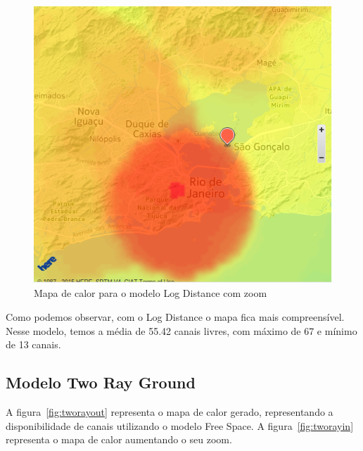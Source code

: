 \begin{figure}[htb]
\centering
\includegraphics[width=1.0\textwidth]{figs/logdistancein}
\caption[Mapa de calor para o modelo Log Distance com zoom]
{Mapa de calor para o modelo Log Distance com zoom}
\label{fig:logdistancein}
\end{figure} 

\FloatBarrier

Como podemos observar, com o Log Distance o mapa fica mais compreensível. Nesse modelo, temos a média de 55.42 canais livres, com máximo de 67 e mínimo de 13 canais.

\subsection{Modelo Two Ray Ground}

A figura~\ref{fig:tworayout} representa o mapa de calor gerado, representando a disponibilidade de canais utilizando o modelo Free Space. A figura~\ref{fig:tworayin} representa o mapa de calor aumentando o seu zoom.

